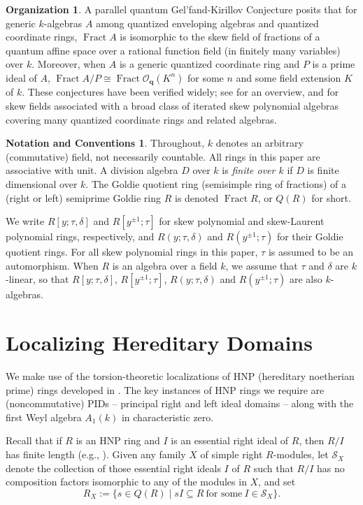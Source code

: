 \documentclass{conm-p-l}
\theoremstyle{definition}
\newtheorem{notation}[theorem]{Notation and Conventions}
\newtheorem{organization}[theorem]{Organization}
\theoremstyle{remark}
\numberwithin{equation}{section}
\newcommand \calO {{\mathcal{O}}}
\newcommand \calS {{\mathcal{S}}}
\newcommand\bfq{\boldsymbol{q}}
\DeclareMathOperator \Fract { {\mathrm{Fract}} }
\newcommand\Obfq{\calO_{\bfq}}
\begin{document}
\begin{organization}
A parallel quantum Gel'fand-Kirillov Conjecture posits that for generic $k$-al\-ge\-bras $A$ among quantized enveloping algebras and quantized coordinate rings, $\Fract A$ is isomorphic to the skew field of fractions of a quantum affine space over a rational function field (in finitely many variables) over $k$.  Moreover, when $A$ is a generic quantized coordinate ring and $P$ is a prime ideal of $A$, $\Fract A/P \cong \Fract \Obfq(K^n)$ for some $n$ and some field extension $K$ of $k$.  These conjectures have been verified widely; see \cite[\S II.10.4]{Bro-Goo} for an overview, and \cite[Section 6]{Cau} for skew fields associated with a broad class of iterated skew polynomial algebras covering many quantized coordinate rings and related algebras.


\end{organization}

\begin{notation} Throughout, $k$ denotes an arbitrary (com\-mu\-ta\-tive) field, not necessarily countable.  All rings in this paper are associative with unit.  A division algebra $D$ over $k$ is \emph{finite over $k$} if $D$ is finite dimensional over $k$. The Goldie quotient ring (semisimple ring of fractions) of a (right or left) semiprime Goldie ring $R$ is denoted $\Fract R$, or $Q(R)$ for short.

We write $R[y;\tau,\delta]$ and $R[y^{\pm 1};\tau]$ for skew polynomial and skew-Laurent polynomial rings, respectively, and $R(y;\tau,\delta)$ and $R(y^{\pm1};\tau)$ for their Goldie quotient rings.  For all skew polynomial rings in this paper, $\tau$ is assumed to be an automorphism.  When $R$ is an algebra over a field $k$, we assume that $\tau$ and $\delta$ are $k$-linear, so that $R[y;\tau,\delta]$, $R[y^{\pm1};\tau]$, $R(y;\tau,\delta)$ and $R(y^{\pm1};\tau)$ are also $k$-algebras.
\end{notation}


\section{Localizing Hereditary Domains}

We make use of the torsion-theoretic localizations of HNP (hereditary noetherian prime) rings developed in \cite{Go74}.  The key instances of HNP rings we require are (noncommutative) PIDs -- principal right and left ideal domains -- along with the first Weyl algebra $A_1(k)$ in characteristic zero.

Recall that if $R$ is an HNP ring and $I$ is an essential right ideal of $R$, then $R/I$ has finite length (e.g., \cite[Proposition 5.4.5]{McC-Rob}).  Given any family $X$ of simple right $R$-modules, let $\calS_X$ denote the collection of those essential right ideals $I$ of $R$ such that $R/I$ has no composition factors isomorphic to any of the modules in $X$, and set
\begin{equation*}
R_X := \{ s \in Q(R) \mid sI \subseteq R\ \text{for some}\ I \in \calS_X \}.
\end{equation*}
\end{document}
